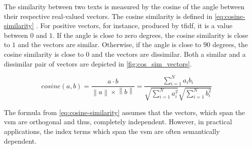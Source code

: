 
The similarity between two texts is measured by the cosine of the angle between their respective real-valued vectors.
The cosine similarity is defined in \autoref{eq:cosine-similarity} \cite{soft_cosine2014}.
For positive vectors, for instance, produced by \ac{tfidf}, it is a value between $0$ and $1$.
If the angle is close to zero degrees, the cosine similarity is close to $1$ and the vectors are similar.
Otherwise, if the angle is close to $90$ degrees, the cosine similarity is close to $0$ and the vectors are dissimilar.
Both a similar and a dissimilar pair of vectors are depicted in \autoref{fig:cos_sim_vectors}.

\begin{equation}
    cosine(a,b) = \frac{a \cdot b}{\left\| a \right\| \times \left\| b \right\|} = \frac{\sum_{i=1}^{N}a_{i}b_{i}}{\sqrt{\sum_{i=1}^{N}{a}^2_{i}}\sqrt{\sum_{i=1}^{N}{b}^2_{i}}}
    \label{eq:cosine-similarity}
\end{equation}

The formula from \autoref{eq:cosine-similarity} assumes that the vectors, which span the \ac{vsm} are orthogonal and thus, 
completely independent.
However, in practical applications, the index terms which span the \ac{vsm} are often semantically dependent.

%